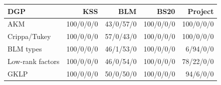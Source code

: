 \begin{tabular}{lrrrr}
\toprule
DGP & KSS & BLM & BS20 & Project \\
\midrule
AKM & 100/0/0/0 & 43/0/57/0 & 100/0/0/0 & 100/0/0/0 \\
Crippa/Tukey & 100/0/0/0 & 57/0/43/0 & 100/0/0/0 & 100/0/0/0 \\
BLM types & 100/0/0/0 & 46/1/53/0 & 100/0/0/0 & 6/94/0/0 \\
Low-rank factors & 100/0/0/0 & 46/0/54/0 & 100/0/0/0 & 78/22/0/0 \\
GKLP & 100/0/0/0 & 50/0/50/0 & 100/0/0/0 & 94/6/0/0 \\
\bottomrule
\end{tabular}

